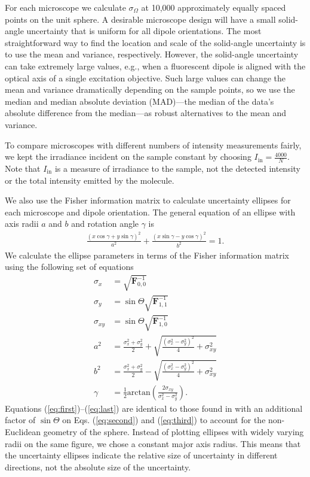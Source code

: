 \documentclass[10pt]{article}
\providecommand{\mb}[1]{\mathbf{#1}}
\begin{document}
For each microscope we calculate $\sigma_{\Omega}$ at 10,000 approximately
equally spaced points on the unit sphere. A desirable microscope design will
have a small solid-angle uncertainty that is uniform for all dipole
orientations. The most straightforward way to find the location and scale of the
solid-angle uncertainty is to use the mean and variance, respectively. However,
the solid-angle uncertainty can take extremely large values, e.g., when a
fluorescent dipole is aligned with the optical axis of a single excitation
objective. Such large values can change the mean and variance dramatically
depending on the sample points, so we use the median and median absolute
deviation (MAD)---the median of the data's absolute difference from the
median---as robust alternatives to the mean and variance.

To compare microscopes with different numbers of intensity measurements fairly,
we kept the irradiance incident on the sample constant by choosing
$I_{\text{in}} = \frac{4000}{N}$. Note that $I_{\text{in}}$ is a measure of
irradiance to the sample, not the detected intensity or the total intensity
emitted by the molecule.

We also use the Fisher information matrix to calculate uncertainty ellipses for
each microscope and dipole orientation. The general equation of an ellipse
with axis radii $a$ and $b$ and rotation angle $\gamma$ is
\hypertarget{ellipse}{{\color{urlblue} 
\begin{align}
  \frac{(x\cos\gamma + y\sin\gamma)^2}{a^2} + \frac{(x\sin\gamma - y\cos\gamma)^2}{b^2} =1. 
\end{align}}}%
We calculate the ellipse parameters in terms of the Fisher information matrix
using the following set of equations
\begin{align}
  \sigma_x &= \sqrt{\mb{F}^{-1}_{0,0}} \label{eq:first}\\
  \sigma_y &= \sin\Theta\sqrt{\mb{F}^{-1}_{1,1}} \label{eq:second}\\ 
  \sigma_{xy} &= \sin\Theta\sqrt{\mb{F}^{-1}_{1,0}} \label{eq:third}\\  
  a^2 &= \frac{\sigma_x^2 + \sigma_y^2}{2} + \sqrt{\frac{(\sigma_x^2 - \sigma_y^2)^2}{4} + \sigma_{xy}^2}\\
  b^2 &= \frac{\sigma_x^2 + \sigma_y^2}{2} - \sqrt{\frac{(\sigma_x^2 - \sigma_y^2)^2}{4} + \sigma_{xy}^2}\\
  \gamma &= \frac{1}{2}\text{arctan}\left(\frac{2\sigma_{xy}}{\sigma_x^2 - \sigma_y^2}\right). \label{eq:last}
\end{align}
Equations (\ref{eq:first})--(\ref{eq:last}) are identical to those found in
\cite{coe2009} with an additional factor of $\sin\Theta$ on {\color{urlblue}Eqs.}
(\ref{eq:second}) and (\ref{eq:third}) to account for the non-Euclidean geometry of
the sphere. Instead of plotting ellipses with widely varying radii on the same
figure, we chose a constant major axis radius. This means that the uncertainty
ellipses indicate the relative size of uncertainty in different directions, not
the absolute size of the uncertainty.
\end{document}
